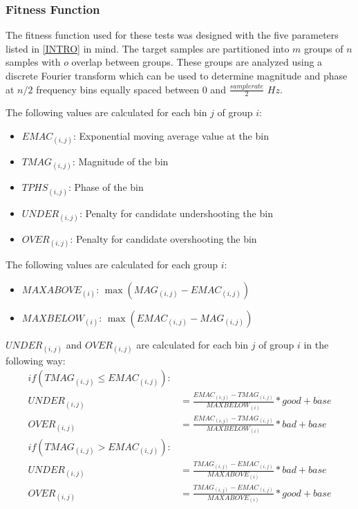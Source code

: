 \documentclass[12pt]{article}
\begin{document}
\subsubsection{Fitness Function}
The fitness function used for these tests was designed with the five parameters listed in \ref{INTRO} in mind. The target samples are partitioned into $m$ groups of $n$ samples with $o$ overlap between groups. These groups are analyzed using a discrete Fourier transform which can be used to determine magnitude and phase at $n/2$ frequency bins equally spaced between $0$ and $\frac{sample rate}{2}$ $Hz$.

The following values are calculated for each bin $j$ of group $i$:
\begin{itemize}
\addtolength{\itemindent}{1cm}
\vspace{-3mm}
\item $EMAC_{(i, j)}$: Exponential moving average value at the bin
\vspace{-3mm}
\item $TMAG_{(i, j)}$: Magnitude of the bin
\vspace{-3mm}
\item $TPHS_{(i, j)}$: Phase of the bin
\vspace{-3mm}
\item $UNDER_{(i, j)}$: Penalty for candidate undershooting the bin
\vspace{-3mm}
\item $OVER_{(i, j)}$: Penalty for candidate overshooting the bin
\vspace{-2mm}
\end{itemize}

The following values are calculated for each group $i$:
\begin{itemize}
\addtolength{\itemindent}{1cm}
\vspace{-3mm} 
\item $MAXABOVE_{(i)}$: $\max{(MAG_{(i, j)} - EMAC_{(i, j)})}$
\vspace{-3mm} 
\item $MAXBELOW_{(i)}$: $\max{(EMAC_{(i, j)} - MAG_{(i, j)})}$
\vspace{-2mm}
\end{itemize}

$UNDER_{(i, j)}$ and $OVER_{(i, j)}$ are calculated for each bin $j$ of group $i$ in the following way:
\vspace{-3mm} 
\begin{align*}
if (TMAG_{(i, j)} \le EMAC_{(i, j)}): \\
UNDER_{(i, j)} &= \frac{EMAC_{(i, j)} - TMAG_{(i, j)}}{MAXBELOW_{(i)}} * good + base \\
OVER_{(i, j)} &= \frac{EMAC_{(i, j)} - TMAG_{(i, j)}}{MAXBELOW_{(i)}} * bad + base \\
if (TMAG_{(i, j)} > EMAC_{(i, j)}): \\
UNDER_{(i, j)} &= \frac{TMAG_{(i, j)} - EMAC_{(i, j)}}{MAXABOVE_{(i)}} * bad + base \\
OVER_{(i, j)} &= \frac{TMAG_{(i, j)} - EMAC_{(i, j)}}{MAXABOVE_{(i)}} * good + base
\end{align*}
\vspace{-2mm}
\end{document}
